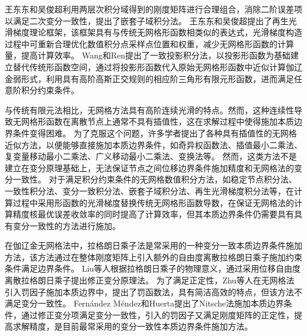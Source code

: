 王东东和吴俊超\textsuperscript{\cite{wang2016}}利用两层次积分域得到的刚度矩阵进行合理组合，消除二阶误差项以满足二次变分一致性，提出了嵌套子域积分法。
王东东和吴俊超提出了再生光滑梯度理论框架\textsuperscript{\cite{wang2019}}，该框架具有与传统无网格形函数相类似的表达式，光滑梯度构造过程中可重新合理优化数值积分点采样点位置和权重，减少无网格形函数的计算量，提高计算效率。
Wang和Ren\textsuperscript{\cite{wang2023}}提出了一致投影积分法，以投影形函数为基础建立替代传统形函数空间，通过将投影形函数代入原始无网格形函数中近似计算伽辽金弱形式，利用具有高阶高斯正交规则的相应阶三角形有限元形函数，进而满足任意阶积分约束条件。\par
与传统有限元法相比，无网格方法具有高阶连续光滑的特点。然而，这种连续性导致无网格形函数在离散节点上通常不具有插值性，这在求解过程中使得施加本质边界条件变得困难。
为了克服这个问题，许多学者提出了各种具有插值性的无网格近似方法，以便能够直接施加本质边界条件\textsuperscript{\cite{CaoYang2020,fernandez-mendez2004}}，如奇异权函数法\textsuperscript{\cite{kaljevic1997}}、插值最小二乘法\textsuperscript{\cite{liu2019,ChenXinXin2021}}、复变量移动最小二乘法\textsuperscript{\cite{ChengYuMin2005}}、广义移动最小二乘法\textsuperscript{\cite{HuangJuan2007}}、变换法\textsuperscript{\cite{chen2000}}等。
然而，这类方法不是建立在变分原理基础上，无法保证节点之间位移边界条件施加精度和无网格法的变分一致性。
对于满足积分约束条件的无网格数值积分方法，如稳定节点积分法\textsuperscript{\cite{chen2001}}、一致性积分法\textsuperscript{\cite{陈嵩涛2020几何非线性分析的高效高阶无网格法,duan2012}}、变分一致积分法\textsuperscript{\cite{chen2013}}、嵌套子域积分法\textsuperscript{\cite{wang2016}}、再生光滑梯度积分法\textsuperscript{\cite{wang2019}}等，在计算过程中采用形函数的光滑梯度替换传统无网格形函数导数，在保证无网格法的计算精度核最优误差收敛率的同时提高了计算效率，但其本质边界条件仍需要具有具有变分一致性的方法进行施加\textsuperscript{\cite{WuJunChao,hillman2021}}。


在伽辽金无网格法中，拉格朗日乘子法\textsuperscript{\cite{belytschko1994}}是常采用的一种变分一致本质边界条件施加方法，该方法通过在整体刚度矩阵上引入额外的自由度离散拉格朗日乘子施加约束条件满足边界条件。
Liu等人\textsuperscript{\cite{lu1994}}根据拉格朗日乘子的物理意义，通过采用位移自由度离散拉格朗日乘子提出修正变分原理法。
为了满足正定性，Zhu等人\textsuperscript{\cite{zhu1998}}在无网格法引入罚因子施加本质边界中，提出了罚函数法，具有简洁高效的特点，但该方法不满足变分一致性。
Fernández Méndez和Huerta\textsuperscript{\cite{fernandez-mendez2004}}提出了Nitsche法施加本质边界条件，通过修正变分项满足变分一致性，引入的罚因子又满足刚度矩阵的正定性，提高求解精度，是目前最常采用的变分一致性本质边界条件施加方法。
